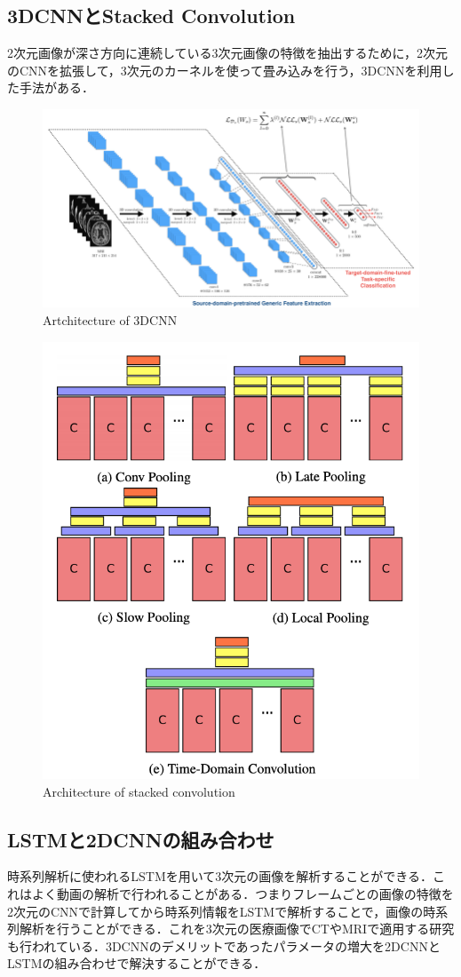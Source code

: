 \subsection{3DCNNとStacked Convolution}
2次元画像が深さ方向に連続している3次元画像の特徴を抽出するために，2次元のCNNを拡張して，3次元のカーネルを使って畳み込みを行う，3DCNNを利用した手法がある．

\begin{figure}[H]
	\centering
	\includegraphics[width=0.7\linewidth]{fig/3d_cnn.png}
	\caption{Artchitecture of 3DCNN}
	\label{fig:3DCNN}
\end{figure}


\begin{figure}[H]
	\centering
	\includegraphics[width=0.7\linewidth]{fig/stacked_conv.png}
	\caption{Architecture of stacked convolution}
	\label{fig:stacked_conv}
\end{figure}

\subsection{LSTMと2DCNNの組み合わせ}
時系列解析に使われるLSTMを用いて3次元の画像を解析することができる．これはよく動画の解析で行われることがある．つまりフレームごとの画像の特徴を2次元のCNNで計算してから時系列情報をLSTMで解析することで，画像の時系列解析を行うことができる．これを3次元の医療画像でCTやMRIで適用する研究も行われている．3DCNNのデメリットであったパラメータの増大を2DCNNとLSTMの組み合わせで解決することができる．


